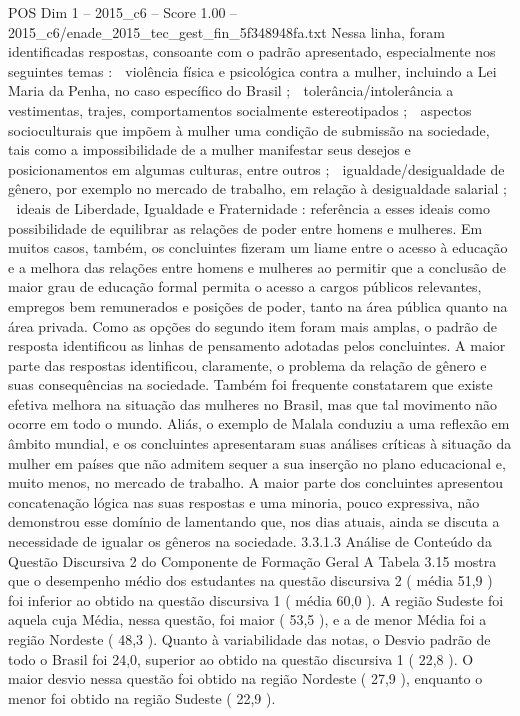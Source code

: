 \begin{textsample}{POS Dim 1 – 2015\_c6 – Score 1.00 – 2015\_c6/enade\_2015\_tec\_gest\_fin\_5f348948fa.txt}
Nessa linha, foram identificadas respostas, consoante com o padrão apresentado, especialmente nos seguintes temas :  violência física e psicológica contra a mulher, incluindo a Lei Maria da Penha, no caso específico do Brasil ;  tolerância/intolerância a vestimentas, trajes, comportamentos socialmente estereotipados ;  aspectos socioculturais que impõem à mulher uma condição de submissão na sociedade, tais como a impossibilidade de a mulher manifestar seus desejos e posicionamentos em algumas culturas, entre outros ;  igualdade/desigualdade de gênero, por exemplo no mercado de trabalho, em relação à desigualdade salarial ;  ideais de Liberdade, Igualdade e Fraternidade : referência a esses ideais como possibilidade de equilibrar as relações de poder entre homens e mulheres.
Em muitos casos, também, os concluintes fizeram um liame entre o acesso à educação e a melhora das relações entre homens e mulheres ao permitir que a conclusão de maior grau de educação formal permita o acesso a cargos públicos relevantes, empregos bem remunerados e posições de poder, tanto na área pública quanto na área privada.
Como as opções do segundo item foram mais amplas, o padrão de resposta identificou as linhas de pensamento adotadas pelos concluintes.
A maior parte das respostas identificou, claramente, o problema da relação de gênero e suas consequências na sociedade.
Também foi frequente constatarem que existe efetiva melhora na situação das mulheres no Brasil, mas que tal movimento não ocorre em todo o mundo.
Aliás, o exemplo de Malala conduziu a uma reflexão em âmbito mundial, e os concluintes apresentaram suas análises críticas à situação da mulher em países que não admitem sequer a sua inserção no plano educacional e, muito menos, no mercado de trabalho.
A maior parte dos concluintes apresentou concatenação lógica nas suas respostas e uma minoria, pouco expressiva, não demonstrou esse domínio de lamentando que, nos dias atuais, ainda se discuta a necessidade de igualar os gêneros na sociedade. 3.3.1.3 Análise de Conteúdo da Questão Discursiva 2 do Componente de Formação Geral A Tabela 3.15 mostra que o desempenho médio dos estudantes na questão discursiva 2 ( média 51,9 ) foi inferior ao obtido na questão discursiva 1 ( média 60,0 ).
A região Sudeste foi aquela cuja Média, nessa questão, foi maior ( 53,5 ), e a de menor Média foi a região Nordeste ( 48,3 ).
Quanto à variabilidade das notas, o Desvio padrão de todo o Brasil foi 24,0, superior ao obtido na questão discursiva 1 ( 22,8 ).
O maior desvio nessa questão foi obtido na região Nordeste ( 27,9 ), enquanto o menor foi obtido na região Sudeste ( 22,9 ).

\end{textsample}
